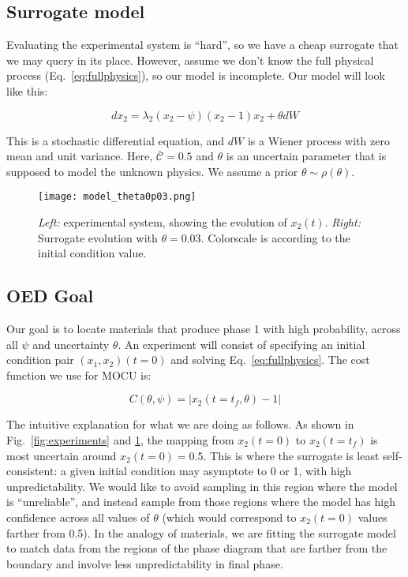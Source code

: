 \documentclass[11pt]{article}
\begin{document}
\subsection{Surrogate model}

Evaluating the experimental system is ``hard'', so we have a cheap
surrogate that we may query in its place. However, assume we don't
know the full physical process (Eq.~\ref{eq:fullphysics}), so our
model is incomplete. Our model will look like this:

\begin{equation}
dx_2 = \lambda_2 \left(x_2 - \psi \right)(x_2-1)x_2 + \theta dW
\label{eq:model}
\end{equation}

This is a stochastic differential equation, and $dW$ is a Wiener
process with zero mean and unit variance. Here, $\mathcal{\bar{C}} =
0.5$ and $\theta$ is an uncertain parameter that is supposed to model
the unknown physics. We assume a prior $\theta \sim \rho(\theta)$.

\begin{figure}[htb]
  \centering
  \texttt{[image: model\_theta0p03.png]}
  \caption{{\it Left:} experimental system, showing the evolution of $x_2(t)$. {\it Right:} Surrogate evolution with $\theta = 0.03$. Colorscale is according to the initial condition value.}
  \label{fig:fullandmodel}
\end{figure}

\subsection{OED Goal}

Our goal is to locate materials that produce phase 1 with high
probability, across all $\psi$ and uncertainty $\theta$. An experiment
will consist of specifying an initial condition pair $(x_1,x_2)(t=0)$
and solving Eq.~\ref{eq:fullphysics}. The cost function we use for
MOCU is:

\begin{equation}
C(\theta , \psi) = | x_2(t=t_f , \theta) - 1 |
\end{equation}

The intuitive explanation for what we are doing as follows. As shown
in Fig.~\ref{fig:experiments} and \ref{fig:fullandmodel}, the mapping
from $x_2(t=0)$ to $x_2(t=t_f)$ is most uncertain around
$x_2(t=0)=0.5$. This is where the surrogate is least self-consistent:
a given initial condition may asymptote to 0 or 1, with high
unpredictability. We would like to avoid sampling in this region where
the model is ``unreliable'', and instead sample from those regions
where the model has high confidence across all values of $\theta$
(which would correspond to $x_2(t=0)$ values farther from 0.5). In the
analogy of materials, we are fitting the surrogate model to match data
from the regions of the phase diagram that are farther from the
boundary and involve less unpredictability in final phase.
\end{document}
